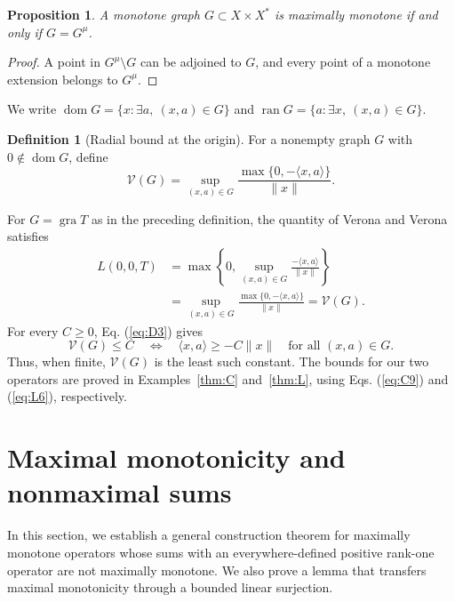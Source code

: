 \documentclass[11pt]{article}
\newcommand{\gra}{\operatorname{gra}}
\newcommand{\dom}{\operatorname{dom}}
\newcommand{\pair}[2]{\langle #1,#2\rangle}
\newtheorem{proposition}{Proposition}
\theoremstyle{definition}
\newtheorem{definition}{Definition}
\theoremstyle{remark}
\begin{document}
\begin{proposition}
A monotone graph $G\subset X\times X^*$ is maximally monotone if and only if $G=G^\mu$.
\end{proposition}
\begin{proof}
A point in $G^\mu\setminus G$ can be adjoined to $G$, and every point of a monotone extension belongs to $G^\mu$.
\end{proof}

We write $\dom G=\{x:\exists a,\ (x,a)\in G\}$ and $\operatorname{ran}G=\{a:\exists x,\ (x,a)\in G\}$.


\begin{definition}[Radial bound at the origin]
For a nonempty graph $G$ with $0\notin\dom G$, define
\begin{equation}
\mathcal V(G)=\sup_{(x,a)\in G}
 \frac{\max\{0,-\pair{x}{a}\}}{\|x\|}.
\label{eq:D3}
\end{equation}
\end{definition}
For $G=\gra T$ as in the preceding definition, the quantity of Verona and Verona \cite[p.~1004]{verona2008} satisfies
\[
\begin{aligned}
L(0,0,T)
&=\max\left\{0,\sup_{(x,a)\in G}\frac{-\pair{x}{a}}{\|x\|}\right\}\\
&=\sup_{(x,a)\in G}\frac{\max\{0,-\pair{x}{a}\}}{\|x\|}
=\mathcal V(G).
\end{aligned}
\]
For every $C\ge0$, Eq. (\ref{eq:D3}) gives
\[
\mathcal V(G)\le C
\quad\Longleftrightarrow\quad
\pair{x}{a}\ge-C\|x\|\quad\text{for all }(x,a)\in G.
\]
Thus, when finite, $\mathcal V(G)$ is the least such constant. The bounds for our two operators are proved in Examples~\ref{thm:C} and~\ref{thm:L}, using Eqs. (\ref{eq:C9}) and (\ref{eq:L6}), respectively.

\section{Maximal monotonicity and nonmaximal sums}
\label{sec:endpoint-criterion}

In this section, we establish a general construction theorem for maximally monotone operators whose sums with an everywhere-defined positive rank-one operator are not maximally monotone. We also prove a lemma that transfers maximal monotonicity through a bounded linear surjection.

\end{document}
